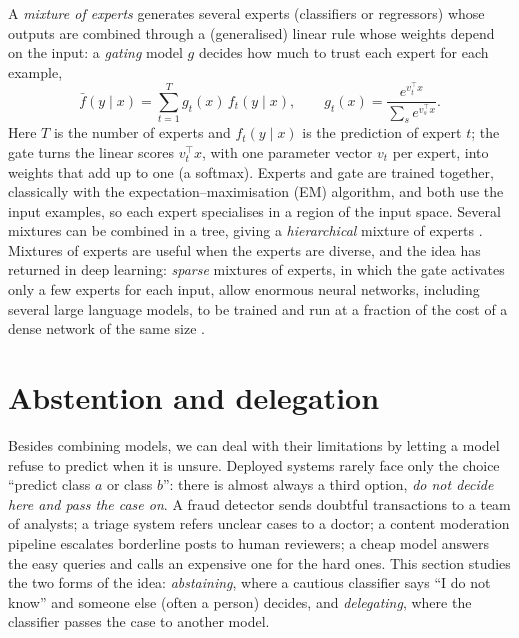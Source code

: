 A \emph{mixture of experts} \citep{jacobs1991adaptive} generates several experts (classifiers or
regressors) whose outputs are combined through a (generalised) linear rule whose weights depend
on the input: a \emph{gating} model $g$ decides how much to trust each expert for each example,
\begin{equation}
  \bar f(y\mid x)=\sum_{t=1}^{T}g_t(x)\,f_t(y\mid x),\qquad
  g_t(x)=\frac{e^{v_t^{\top}x}}{\sum_{s}e^{v_s^{\top}x}}.
\end{equation}
Here $T$ is the number of experts and $f_t(y\mid x)$ is the prediction of expert $t$; the gate turns the linear scores $v_t^{\top}x$, with one parameter vector $v_t$ per expert, into weights that add up to one (a softmax). Experts and gate are trained together, classically with the expectation--maximisation (EM)
algorithm, and both use the input examples, so each expert specialises in a region of the input
space. Several mixtures can be combined in a tree, giving a \emph{hierarchical} mixture of
experts \citep{jordan1994hierarchical}. Mixtures of experts are useful when the experts are
diverse, and the idea has returned in deep learning: \emph{sparse} mixtures of
experts, in which the gate activates only a few experts for each input, allow enormous neural
networks, including several large language models, to be trained and run at a fraction of the
cost of a dense network of the same size \citep{shazeer2017outrageously,fedus2022switch}.

\section{Abstention and delegation}\label{sec:cautious}

Besides combining models, we can deal with their limitations by letting a model refuse to predict when it is unsure. Deployed systems rarely face only the choice ``predict class $a$ or class $b$'': there is
almost always a third option, \emph{do not decide here and pass the case on}. A fraud detector
sends doubtful transactions to a team of analysts; a triage system refers unclear cases to a
doctor; a content moderation pipeline escalates borderline posts to human reviewers; a cheap
model answers the easy queries and calls an expensive one for the hard ones. This section
studies the two forms of the idea: \emph{abstaining}, where a cautious classifier says ``I do not
know'' and someone else (often a person) decides, and \emph{delegating}, where the classifier
passes the case to another model.

